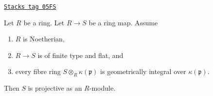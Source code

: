 \begin{lemma}
\label{flat-lemma-fibres-irreducible-flat-projective}
\href{https://stacks.math.columbia.edu/tag/05FS}{\texttt{Stacks tag 05FS}}

Let $R$ be a ring.
Let $R \to S$ be a ring map.
Assume
\begin{enumerate}
\item $R$ is Noetherian,
\item $R \to S$ is of finite type and flat, and
\item every fibre ring $S \otimes_R \kappa(\mathfrak p)$ is
geometrically integral over $\kappa(\mathfrak p)$.
\end{enumerate}
Then $S$ is projective as an $R$-module.
\end{lemma}

